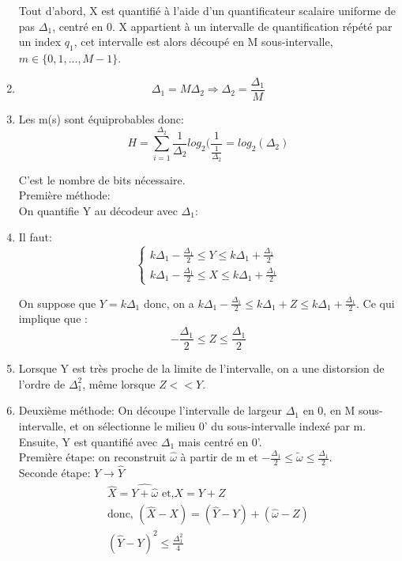 \documentclass{../../td}
\begin{document}
\begin{enumerate}
Tout d'abord, X est quantifié à l'aide d'un quantificateur scalaire uniforme de pas $\Delta_1$, centré en 0. X appartient à un intervalle de quantification répété par un index $q_1$, cet intervalle est alors découpé en M sous-intervalle, $m \in \{0,1,...,M-1\}$.

\item \[\Delta_1 = M\Delta_2 \Rightarrow \Delta_2 = \frac{\Delta_1}{M} \]

\item Les m(s) sont équiprobables donc:
\[H = \sum_{i=1}^{\Delta_2} \frac{1}{\Delta_2}log_2(\frac{1}{\frac{1}{\Delta_2}} = log_2(\Delta_2) \]

C'est le nombre de bits nécessaire.\\

Première méthode:\\
On quantifie Y au décodeur avec $\Delta_1$:


\item Il faut:
\[
    \begin{cases}
      k\Delta_1 - \frac{\Delta_1}{2} \leq Y \leq k\Delta_1 + \frac{\Delta_1}{2}\\
      k\Delta_1 -\frac{\Delta_1}{2} \leq X \leq k\Delta_1 + \frac{\Delta_1}{2}
    \end{cases}
\]

On suppose que $Y = k \Delta_1$ donc, on a $k\Delta_1 - \frac{\Delta_1}{2} \leq k \Delta_1 + Z \leq k\Delta_1 + \frac{\Delta_1}{2}$. Ce qui implique que :
\[-\frac{\Delta_1}{2} \leq Z \leq \frac{\Delta_1}{2}\]

\item Lorsque Y est très proche de la limite de l'intervalle, on a une distorsion de l'ordre de $\Delta_1^2$, même lorsque $Z << Y$.

\item Deuxième méthode: On découpe l'intervalle de largeur $\Delta_1$ en 0, en M sous-intervalle, et on sélectionne le milieu 0' du sous-intervalle indexé par m.
Ensuite, Y est quantifié avec $\Delta_1$ mais centré en 0'.\\


Première étape: on reconstruit $\hat{\omega}$ à partir de m et $-\frac{\Delta_1}{2} \leq \tilde{\omega} \leq \frac{\Delta_1}{2}$.\\
Seconde étape: $Y \rightarrow \hat{Y}$\\
\begin{align*}
\hat{X} = \hat{Y + \hat{\omega}} \text{ et,} X = Y + Z\\
\text{donc, } (\hat{X}-X) = (\hat{Y} - Y) + (\hat{\omega} - Z)\\
(\hat{Y}-Y)^2 \leq \frac{\Delta_1^2}{4}
\end{align*}


\end{enumerate}
\end{document}
